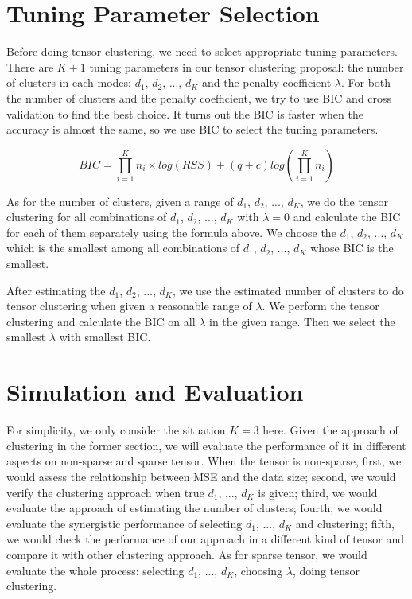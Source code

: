 \documentclass{article}
\begin{document}
\section{Tuning Parameter Selection}
Before doing tensor clustering, we need to select appropriate tuning parameters. 
There are $K+1$ tuning parameters in our tensor clustering proposal: the number of clusters in each modes: $d_1$, $d_2$, ..., $d_K$ and the penalty coefficient $\lambda$. For both the number of clusters and the penalty coefficient, we try to use BIC and cross validation to find the best choice. It turns out the BIC is faster when the accuracy is almost the same, so we use BIC to select the tuning parameters. \par
\begin{equation*}
BIC = \prod_{i=1}^K n_i\times log(RSS)+(q+c)log(\prod_{i=1}^K n_i)
\end{equation*}

As for the number of clusters, given a range of $d_1$, $d_2$, ..., $d_K$, we do the tensor clustering for all combinations of $d_1$, $d_2$, ..., $d_K$ with $\lambda=0$ and calculate the BIC for each of them separately using the formula above. We choose the $d_1$, $d_2$, ..., $d_K$ which is the smallest among all combinations of $d_1$, $d_2$, ..., $d_K$ whose BIC is the smallest. \par

 After estimating the $d_1$, $d_2$, ..., $d_K$, we use the estimated number of clusters to do tensor clustering when given a reasonable range of $\lambda$. We perform the tensor clustering and calculate the BIC on all $\lambda$ in the given range. Then we select the smallest $\lambda$ with smallest BIC.

\section{Simulation and Evaluation}
For simplicity, we only consider the situation $K=3$ here. 
Given the approach of clustering in the former section, we will evaluate the performance of it in different aspects on non-sparse and sparse tensor. When the tensor is non-sparse, first, we would assess the relationship between MSE and the data size; second, we would verify the clustering approach when true $d_1$, ..., $d_K$ is given; third, we would evaluate the approach of estimating the number of clusters; fourth, we would evaluate the synergistic performance of selecting $d_1$, ..., $d_K$ and clustering; fifth, we would check the performance of our approach in a different kind of tensor and compare it with other clustering approach. As for sparse tensor, we would evaluate the whole process: selecting $d_1$, ..., $d_K$, choosing $\lambda$, doing tensor clustering.\par 
\end{document}
